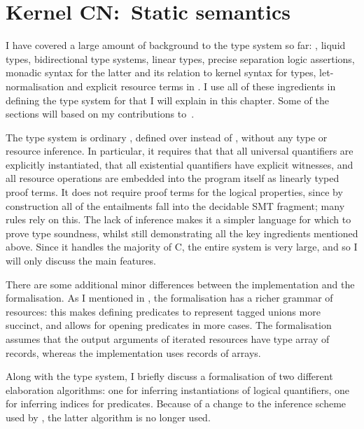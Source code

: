 \chapter{Kernel CN:\ Static semantics}\label{chap:kernel-statics}

\margintoc{}%
%
I have covered a large amount of background to the type system so far:
, liquid types, bidirectional type systems, linear types, precise
separation logic assertions, monadic syntax for the latter and its relation to
kernel syntax for types, let-normalisation and explicit resource terms in
. I use all of these ingredients in defining the type system for
 that I will explain in this chapter. Some of the sections will
based on my contributions to~.%

The  type system is ordinary , defined over 
instead of , without any type or resource inference. In particular, it
requires that that all universal quantifiers are explicitly instantiated, that
all existential quantifiers have explicit witnesses, and all resource
operations are embedded into the program itself as linearly typed proof terms.
It does not require proof terms for the logical properties, since by
construction all of the entailments fall into the decidable SMT fragment; many
rules rely on this. The lack of inference makes it a simpler language for which
to prove type soundness, whilst still demonstrating all the key ingredients
mentioned above. Since it handles the majority of C, the entire system is very
large, and so I will only discuss the main features.

There are some additional minor differences between the implementation and the
formalisation. As I mentioned in , the formalisation has a
richer grammar of resources: this makes defining predicates to represent tagged
unions more succinct, and allows for opening predicates in more cases. The
formalisation assumes that the output arguments of iterated resources have type array
of records, whereas the implementation uses records of arrays.

Along with the type system, I briefly discuss a formalisation of two different
elaboration algorithms: one for inferring instantiations of logical quantifiers,
one for inferring indices for  predicates. Because of a change
to the inference scheme used by , the latter algorithm is no longer
used.\label{sn:new-inf-statics}

